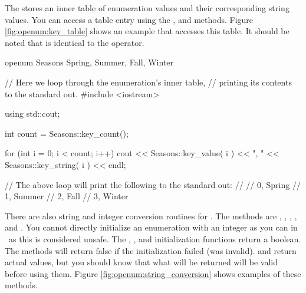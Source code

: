 The  stores an inner table of enumeration values and their corresponding string values.  You can access a table entry using the ,  and  methods.  Figure \ref{fig:openum:key_table} shows an example that accesses this table.  It should be noted that  is identical to the  operator. \\

\begin{opcpp}[label={fig:openum:key_table},caption={Accessing an \opcppk{openum}'s inner table.}]
openum Seasons
{
    Spring,
    Summer,
    Fall,
    Winter
}

// Here we loop through the enumeration's inner table,
// printing its contents to the standard out.
#include <iostream>

using std::cout;

int count = Seasons::key_count();

for (int i = 0; i < count; i++)
    cout << Seasons::key_value( i ) << ", " << Seasons::key_string( i ) << endl;

// The above loop will print the following to the standard out:
//
// 0, Spring
// 1, Summer
// 2, Fall
// 3, Winter
\end{opcpp}

There are also string and integer conversion routines for .  The methods are , , , ,  and .  You cannot directly initialize an enumeration with an integer as you can in \cpp\ as this is considered unsafe.  The , ,  and  initialization functions return a boolean.  The methods will return false if the initialization failed (was invalid).   and  return actual values, but you should know that what will be returned will be valid before using them.  Figure \ref{fig:openum:string_conversion} shows examples of these methods.

